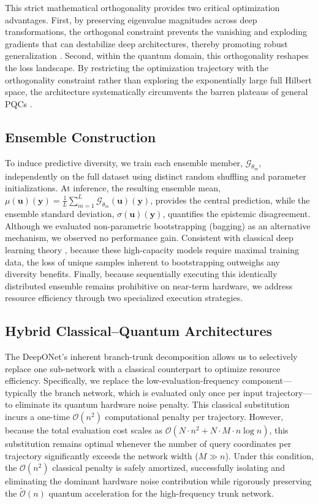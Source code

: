 \documentclass{iopjournal}
\begin{document}
This strict mathematical orthogonality provides two critical optimization advantages. First, by preserving eigenvalue magnitudes across deep transformations, the orthogonal constraint prevents the vanishing and exploding gradients that can destabilize deep architectures, thereby promoting robust generalization \cite{kerenidis2022qorthonn, landman2022medicalqorthonn}. Second, within the quantum domain, this orthogonality reshapes the loss landscape. By restricting the optimization trajectory with the orthogonality constraint rather than exploring the exponentially large full Hilbert space, the architecture systematically circumvents the barren plateaus of general PQCs \cite{wang2021barren, mcclean2018barren, schumann2024barren}.

\subsection{Ensemble Construction}

To induce predictive diversity, we train each ensemble member, $\mathcal{G}_{\theta_m}$, independently on the full dataset using distinct random shuffling and parameter initializations. At inference, the resulting ensemble mean, $\mu(\mathbf{u})(\mathbf{y}) = \frac{1}{L} \sum_{m=1}^L \mathcal{G}_{\theta_m}(\mathbf{u})(\mathbf{y})$, provides the central prediction, while the ensemble standard deviation, $\sigma(\mathbf{u})(\mathbf{y})$, quantifies the epistemic disagreement. Although we evaluated non-parametric bootstrapping (bagging) as an alternative mechanism, we observed no performance gain. Consistent with classical deep learning theory \cite{lakshminarayanan2017deep, lee2015mheads}, because these high-capacity models require maximal training data, the loss of unique samples inherent to bootstrapping outweighs any diversity benefits. Finally, because sequentially executing this identically distributed ensemble remains prohibitive on near-term hardware, we address resource efficiency through two specialized execution strategies.

\subsection{Hybrid Classical–Quantum Architectures}

The DeepONet's inherent branch-trunk decomposition allows us to selectively replace one sub-network with a classical counterpart to optimize resource efficiency. Specifically, we replace the low-evaluation-frequency component—typically the branch network, which is evaluated only once per input trajectory—to eliminate its quantum hardware noise penalty. This classical substitution incurs a one-time $\mathcal{O}(n^2)$ computational penalty per trajectory. However, because the total evaluation cost scales as $\mathcal{O}(N \cdot n^2 + N \cdot M \cdot n \log n)$, this substitution remains optimal whenever the number of query coordinates per trajectory significantly exceeds the network width ($M \gg n$). Under this condition, the $\mathcal{O}(n^2)$ classical penalty is safely amortized, successfully isolating and eliminating the dominant hardware noise contribution while rigorously preserving the $\tilde{\mathcal{O}}(n)$ quantum acceleration for the high-frequency trunk network.
\end{document}

